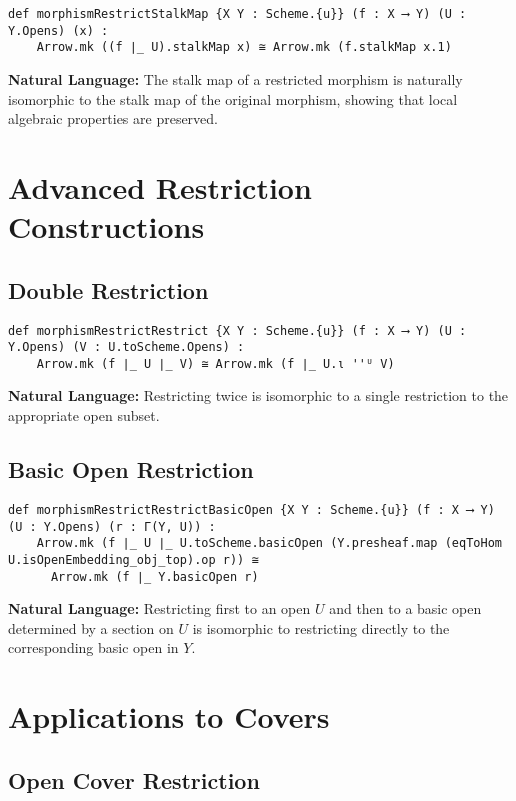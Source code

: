 \documentclass{article}
\theoremstyle{definition}
\begin{document}
\begin{lstlisting}
def morphismRestrictStalkMap {X Y : Scheme.{u}} (f : X ⟶ Y) (U : Y.Opens) (x) :
    Arrow.mk ((f ∣_ U).stalkMap x) ≅ Arrow.mk (f.stalkMap x.1)
\end{lstlisting}

\textbf{Natural Language:} The stalk map of a restricted morphism is naturally isomorphic to the stalk map of the original morphism, showing that local algebraic properties are preserved.

\section{Advanced Restriction Constructions}

\subsection{Double Restriction}

\begin{lstlisting}
def morphismRestrictRestrict {X Y : Scheme.{u}} (f : X ⟶ Y) (U : Y.Opens) (V : U.toScheme.Opens) :
    Arrow.mk (f ∣_ U ∣_ V) ≅ Arrow.mk (f ∣_ U.ι ''ᵁ V)
\end{lstlisting}

\textbf{Natural Language:} Restricting twice is isomorphic to a single restriction to the appropriate open subset.

\subsection{Basic Open Restriction}

\begin{lstlisting}
def morphismRestrictRestrictBasicOpen {X Y : Scheme.{u}} (f : X ⟶ Y) (U : Y.Opens) (r : Γ(Y, U)) :
    Arrow.mk (f ∣_ U ∣_ U.toScheme.basicOpen (Y.presheaf.map (eqToHom U.isOpenEmbedding_obj_top).op r)) ≅
      Arrow.mk (f ∣_ Y.basicOpen r)
\end{lstlisting}

\textbf{Natural Language:} Restricting first to an open $U$ and then to a basic open determined by a section on $U$ is isomorphic to restricting directly to the corresponding basic open in $Y$.

\section{Applications to Covers}

\subsection{Open Cover Restriction}
\end{document}
